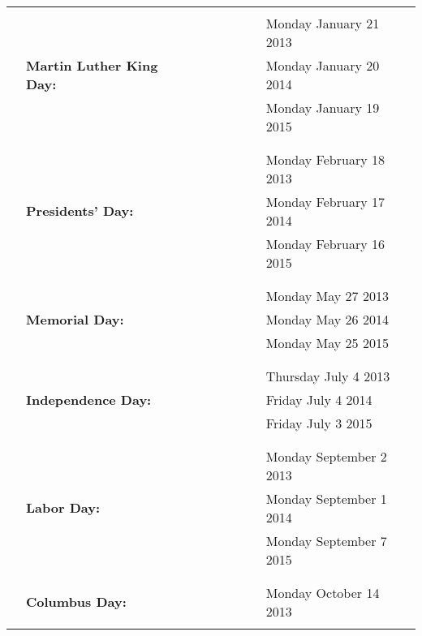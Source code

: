 \documentclass{article}
\begin{document}
\begin{table}\
\centering
\begin{tabular}{llllllllll}
\hline
 &  &  &  &  &  &  &  &  & \\
 &  &  &  &  &  &  &  & Monday January 21 2013 & \\
 & \textbf{Martin Luther King Day:} &  &  &  &  &  &  & Monday January 20 2014 & \\
 &  &  &  &  &  &  &  & Monday January 19 2015 & \\
 &  &  &  &  &  &  &  &  & \\
\hline
 &  &  &  &  &  &  &  &  & \\
 &  &  &  &  &  &  &  & Monday February 18 2013 & \\
 & \textbf{Presidents' Day:} &  &  &  &  &  &  & Monday February 17 2014 & \\
 &  &  &  &  &  &  &  & Monday February 16 2015 & \\
 &  &  &  &  &  &  &  &  & \\
\hline
 &  &  &  &  &  &  &  &  & \\
 &  &  &  &  &  &  &  & Monday May 27 2013 & \\
 & \textbf{Memorial Day:} &  &  &  &  &  &  & Monday May 26 2014 & \\
 &  &  &  &  &  &  &  & Monday May 25 2015 & \\
 &  &  &  &  &  &  &  &  & \\
\hline
 &  &  &  &  &  &  &  &  & \\
 &  &  &  &  &  &  &  & Thursday July 4 2013 & \\
 & \textbf{Independence Day:} &  &  &  &  &  &  & Friday July 4 2014 & \\
 &  &  &  &  &  &  &  & Friday July 3 2015 & \\
 &  &  &  &  &  &  &  &  & \\
\hline
 &  &  &  &  &  &  &  &  & \\
 &  &  &  &  &  &  &  & Monday September 2 2013 & \\
 & \textbf{Labor Day:} &  &  &  &  &  &  & Monday September 1 2014 & \\
 &  &  &  &  &  &  &  & Monday September 7 2015 & \\
 &  &  &  &  &  &  &  &  & \\
\hline
 &  &  &  &  &  &  &  &  & \\
 & \textbf{Columbus Day:} &  &  &  &  &  &  & Monday October 14 2013 & \\
 &  &  &  &  &  &  &  &  & \\

\end{tabular}
\end{table}
\end{document}
